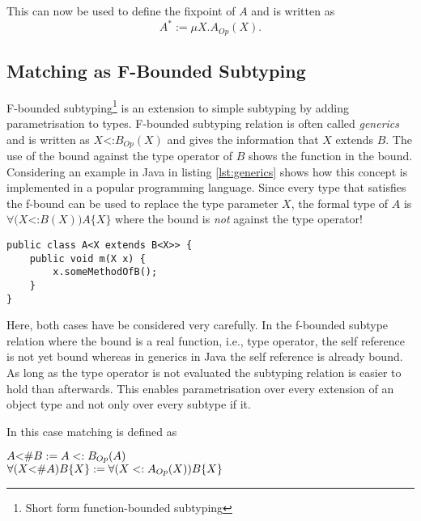 This can now be used to define the fixpoint of $A$ and is written as \[A^*
:= \mu X.A_{Op}(X).\]


\subsection{Matching as F-Bounded Subtyping}
F-bounded subtyping\footnote{Short form function-bounded subtyping}
is an extension to simple subtyping by adding parametrisation to
types. F-bounded subtyping relation is often called \emph{generics}
and is written as $X$<:$B_{Op}(X)$ and gives the information that $X$
extends $B$. The use of the bound against the type operator of $B$
shows the function in the bound. Considering an example in Java in
listing \ref{lst:generics} shows how this concept is implemented in a popular
programming language. Since every type that satisfies the f-bound can
be used to replace the type parameter $X$, the formal type of $A$ is
$\forall(X$<:$B(X))A\{X\}$ where the bound is \emph{not} against the 
type operator!

\begin{lstlisting}[float,caption={Universal quantified f-bound in Java},label={lst:generics}]
public class A<X extends B<X>> {
	public void m(X x) {
		x.someMethodOfB();
	}
}
\end{lstlisting}

Here, both cases have be considered very carefully. In the f-bounded subtype
relation where the bound is a real function, i.e., type operator,
the self reference is not yet bound whereas in generics in Java the self
reference is already bound. As long as the type operator is not evaluated
the subtyping relation is easier to hold than afterwards. This enables 
parametrisation over every extension of an object type and not only over
every subtype if it.

In this case matching is defined as\cite{abadi_subtyping_1996}
\begin{defn}
	\label{def:matchingAsBound}
	$A \textnormal{<\#} B := A <: B_{Op}(A)$\\
	$\forall (X \textnormal{<\#} A)B\{X\} := \forall (X <: A_{Op}(X))B\{X\}$
\end{defn}

%

